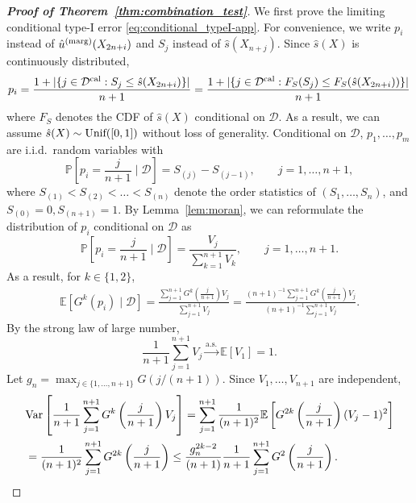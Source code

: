\documentclass[11pt]{article}
\newcommand{\Unif}{\textnormal{Unif}}
\newcommand{\Dcal}{\mathcal{D}^\textnormal{cal}}
\newcommand{\Var}{\textnormal{Var}}
\def\E{\mathbb{E}}
\def\marg{\textnormal{(marg)}}
\renewcommand{\P}{\mathbb{P}}
\begin{document}
\begin{proof}[\textbf{Proof of Theorem~\ref{thm:combination_test}}]
We first prove the limiting conditional type-I error \eqref{eq:conditional_typeI-app}. For convenience, we write $p_i$ instead of $\hat{u}^\marg(X_{2n+i})$ and $S_j$ instead of $\hat{s}(X_{n+j})$. Since $\hat{s}(X)$ is continuously distributed, 
\[
p_i = \frac{1 + |\{j\in \Dcal: S_{j} \le \hat{s}(X_{2n+i}) \}|}{n + 1} = \frac{1 + |\{j\in \Dcal: F_{S}(S_{j}) \le F_{S}(\hat{s}(X_{2n+i})) \}|}{n + 1}\]
where $F_{S}$ denotes the CDF of $\hat{s}(X)$ conditional on $\mathcal{D}$. As a result, we can assume $\hat{s}(X)\sim \Unif([0, 1])$ without loss of generality. Conditional on $\mathcal{D}$, $p_1, \ldots, p_{m}$ are i.i.d.~random variables with 
\[\P\left[p_i = \frac{j}{n+1}\mid \mathcal{D} \right] = S_{(j)} - S_{(j-1)}, \qquad j = 1,\ldots, n+1,
\]
where $S_{(1)} < S_{(2)} < \ldots < S_{(n)}$ denote the order statistics of $(S_1, \ldots, S_{n})$, and $S_{(0)} = 0, S_{(n + 1)}= 1$. By Lemma~\ref{lem:moran}, we can reformulate the distribution of $p_i$ conditional on $\mathcal{D}$ as 
\begin{equation}\label{eq:pi_dist}
    \P\left[p_i = \frac{j}{n+1}\mid \mathcal{D}\right] = \frac{V_{j}}{\sum_{k=1}^{n+1}V_{k}}, \qquad j = 1,\ldots, n+1.
\end{equation}
As a result, for $k \in \{1, 2\}$,
\begin{align}\label{eq:EGk}
\E\left[G^k(p_i)\mid \mathcal{D}\right] = \frac{\sum_{j=1}^{n+1}G^k\left(\frac{j}{n+1}\right)V_{j}}{\sum_{j=1}^{n+1}V_{j}} = \frac{(n+1)^{-1}\sum_{j=1}^{n+1}G^k\left(\frac{j}{n+1}\right)V_{j}}{(n+1)^{-1}\sum_{j=1}^{n+1}V_{j}}.
\end{align}
By the strong law of large number,
\begin{equation}\label{eq:LLN_sumV}
\frac{1}{n+1}\sum_{j=1}^{n+1}V_{j}\stackrel{\mathrm{a.s.}}{\rightarrow}\E[V_{1}] = 1.
\end{equation}
Let $g_{n} = \max_{j\in \{1, \ldots, n+1\}}G(j / (n + 1))$. Since $V_1, \ldots, V_{n+1}$ are independent, 
\begin{align}
&\Var\left[\frac{1}{n+1}\sum_{j=1}^{n+1}G^k\left(\frac{j}{n+1}\right)V_{j}\right] = \sum_{j=1}^{n+1}\frac{1}{(n + 1)^2}\E\left[G^{2k}\left(\frac{j}{n+1}\right)(V_{j} - 1)^2\right]\nonumber\\
& = \frac{1}{(n + 1)^2}\sum_{j=1}^{n + 1}G^{2k}\left(\frac{j}{n+1}\right)\le \frac{g_{n}^{2k - 2}}{(n + 1)}\frac{1}{n+1}\sum_{j=1}^{n + 1}G^{2}\left(\frac{j}{n+1}\right).\label{eq:G2k}
\end{align}

\end{proof}
\end{document}
